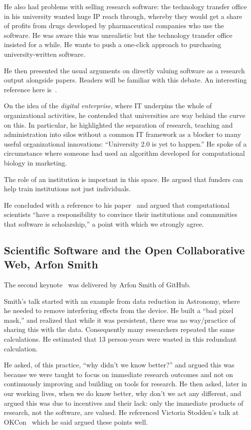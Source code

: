 \documentclass[11pt, oneside]{amsart}
\begin{document}
He also had problems with selling research software: the technology transfer
office in his university wanted huge IP reach through, whereby they would get a
share of profits from drugs developed by pharmaceutical companies who use the software.
He was aware this was unrealistic but the technology transfer office insisted
for a while. He wants to push a one-click approach to purchasing
university-written software.

He then presented the usual arguments on directly valuing software as a
research output alongside papers. Readers will be familiar with this debate. An
interesting reference here is~\cite{peer-review-code}.

On the idea of the \emph{digital enterprise}, where IT underpins the whole of
organizational activities, he contended that universities are way behind the
curve on this. In particular, he highlighted the separation of research,
teaching and administration into silos without a common IT framework as a
blocker to many useful organizational innovations: ``University 2.0 is yet to
happen.'' He spoke of a circumstance where someone had used an algorithm
developed for computational biology in marketing.

The role of an institution is important in this space. He argued that funders
can help train institutions not just individuals.

He concluded with a reference to his paper~\cite{bourne_ten} and argued that
computational scientists ``have a responsibility to convince their institutions
and communities that software is scholarship,'' a point with which we strongly
agree.

\subsection{Scientific Software and the Open Collaborative Web, Arfon Smith}

The second keynote~\cite{WSSSPE1-keynote2} was delivered by Arfon
Smith of GitHub.

Smith's talk started with an example from data reduction in Astronomy, where he
needed to remove interfering effects from the device. He built a ``bad
pixel mask,'' and realized that while it was persistent, there was no
way/practice of sharing this with the data. Consequently many researchers
repeated the same calculations. He estimated that 13 person-years were
wasted in this redundant calculation.

He asked, of this practice, ``why didn't we know better?'' and argued
this was because we were taught to focus on immediate research
outcomes and not on continuously improving and building on tools for
research. He then asked, later in our working lives, when we do know
better, why don't we act any different, and argued this was due to
incentives and their lack: only the immediate products of research,
not the software, are valued.  He referenced Victoria Stodden's talk
at OKCon~\cite{okcon-stodden-talk}
which he said argued these points well.
\end{document}
